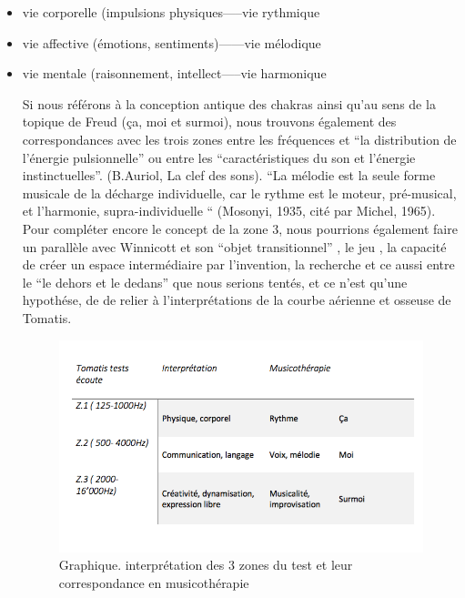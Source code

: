 \begin{itemize}
  \item vie corporelle (impulsions physiques-----vie rythmique
  \item vie affective (émotions, sentiments)------vie mélodique
    \item vie mentale (raisonnement, intellect-----vie harmonique

Si nous référons à la conception antique des chakras ainsi qu'au sens de la
topique de Freud (ça, moi et surmoi), nous trouvons également des correspondances
avec les trois zones entre les
fréquences et ``la distribution de l'énergie pulsionnelle'' ou entre
les 
``caractéristiques du son et l'énergie instinctuelles''. (B.Auriol, La
clef des sons).
``La mélodie est la seule forme musicale de la décharge individuelle, car le rythme est le moteur, pré-musical, et l'harmonie, supra-individuelle `` (Mosonyi, 1935, cité par Michel, 1965).
Pour compléter encore le concept de la zone 3, nous pourrions
également faire un parallèle avec Winnicott et son ``objet
transitionnel'' , le jeu , la capacité de créer un espace
intermédiaire par l'invention, la recherche et ce aussi entre le ``le
dehors et le dedans'' que nous serions tentés, et ce n'est qu'une
hypothése, de de relier à l'interprétations de la courbe aérienne et osseuse de Tomatis. 
 

\begin{figure}
	\centering
	\includegraphics[width=0.7\linewidth]{images/testinterpmusico}
	\caption[ L'interprétation des 3 zones et leur correspondance
        en musicothérapie]{Graphique. interprétation des 3 zones du
          test et leur correspondance en musicothérapie}
       
	\label{graphiquecolonnetestmusico}
      \end{figure}












\end{itemize}
